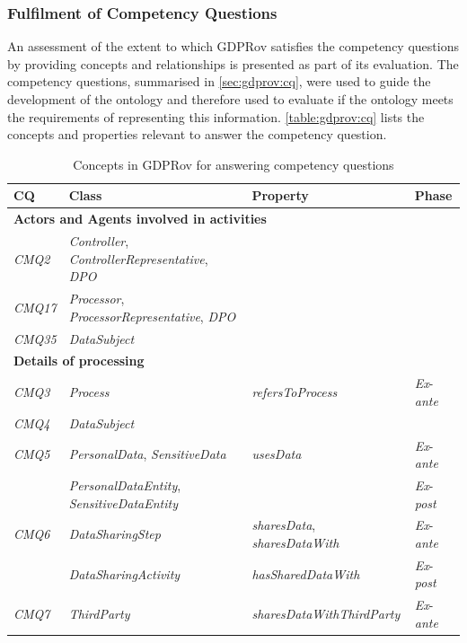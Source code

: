 \subsubsection{Fulfilment of Competency Questions}
An assessment of the extent to which GDPRov satisfies the competency questions by providing concepts and relationships is presented as part of its evaluation.
The competency questions, summarised in \autoref{sec:gdprov:cq}, were used to guide the development of the ontology and therefore used to evaluate if the ontology meets the requirements of representing this information.
\autoref{table:gdprov:cq} lists the concepts and properties relevant to answer the competency question.
\begin{table}[htbp]
\footnotesize
\centering
{}
\begin{tabularx}{\linewidth}{|l|X|p{5cm}|l|}
\caption{Concepts in GDPRov for answering competency questions} \\
\hline
\textbf{CQ} & \textbf{Class} & \textbf{Property} & \textbf{Phase} \\ \hline
\multicolumn{4}{|l|}{\textbf{Actors and Agents involved in activities}}  \\ \hline
\textit{CMQ2} & \textit{Controller}, \textit{ControllerRepresentative}, \textit{DPO} &  &  \\ \hline
\textit{CMQ17} & \textit{Processor}, \textit{ProcessorRepresentative}, \textit{DPO} &  &  \\ \hline
\textit{CMQ35} & \textit{DataSubject} &  &  \\ \hline
\multicolumn{4}{|l|}{\textbf{Details of processing}}  \\ \hline
\textit{CMQ3} & \textit{Process} & \textit{refersToProcess} & \textit{Ex}-\textit{ante} \\ \hline
\textit{CMQ4} & \textit{DataSubject} &  &  \\ \hline
\textit{CMQ5} & \textit{PersonalData}, \textit{SensitiveData} & \textit{usesData} & \textit{Ex}-\textit{ante} \\ \hline
 & \textit{PersonalDataEntity}, \textit{SensitiveDataEntity} &  & \textit{Ex}-\textit{post} \\ \hline
\textit{CMQ6} & \textit{DataSharingStep} & \textit{sharesData}, \textit{sharesDataWith} & \textit{Ex}-\textit{ante} \\ \hline
 & \textit{DataSharingActivity} & \textit{hasSharedDataWith} & \textit{Ex}-\textit{post} \\ \hline
\textit{CMQ7} & \textit{ThirdParty} & \textit{sharesDataWithThirdParty} & \textit{Ex}-\textit{ante} \\ \hline

\end{tabularx}
\end{table}
